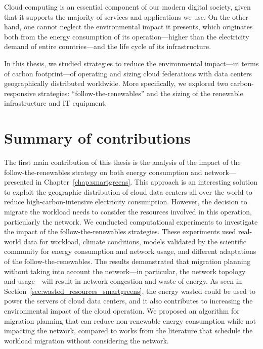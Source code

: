 Cloud computing is an essential component of our modern digital society, given that it supports the majority of services and applications we use. On the other hand, one cannot neglect the environmental impact it presents, which originates both from the energy consumption of its operation---higher than the electricity demand of entire countries---and the life cycle of its infrastructure.

In this thesis, we studied strategies to reduce the environmental impact---in terms of carbon footprint---of operating and sizing cloud federations with data centers geographically distributed worldwide. More specifically, we explored two carbon-responsive strategies: ``follow-the-renewables'' and the sizing of the renewable infrastructure and IT equipment.

\section{Summary of contributions }

\label{sec:conclusion_summary}

The first main contribution of this thesis is the analysis of the impact of the follow-the-renewables strategy on both energy consumption and network---presented in Chapter~\ref{chap:smartgreens}. This approach is an interesting solution to exploit the geographic distribution of cloud data centers all over the world to reduce high-carbon-intensive electricity consumption. However, the decision to migrate the workload needs to consider the resources involved in this operation, particularly the network. We conducted computational experiments to investigate the impact of the follow-the-renewables strategies. These experiments used real-world data for workload, climate conditions, models validated by the scientific community for energy consumption and network usage, and different adaptations of the follow-the-renewables. The results demonstrated that migration planning without taking into account the network---in particular, the network topology and usage---will result in network congestion and waste of energy. As seen in Section~\ref{sec:wasted_resources_smartgreens}, the energy wasted could be used to power the servers of cloud data centers, and it also contributes to increasing the environmental impact of the cloud operation. We proposed an algorithm for migration planning that can reduce non-renewable energy consumption while not impacting the network, compared to works from the literature that schedule the workload migration without considering the network.

